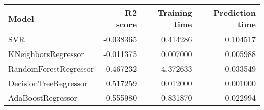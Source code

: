 \begin{tabular}{lrrr}
\toprule
Model & R2 score & Training time & Prediction time \\
\midrule
SVR & -0.038365 & 0.414286 & 0.104517 \\
KNeighborsRegressor & -0.011375 & 0.007000 & 0.005988 \\
RandomForestRegressor & 0.467232 & 4.372633 & 0.033549 \\
DecisionTreeRegressor & 0.517259 & 0.012000 & 0.001000 \\
AdaBoostRegressor & 0.555980 & 0.831870 & 0.022994 \\
\bottomrule
\end{tabular}
